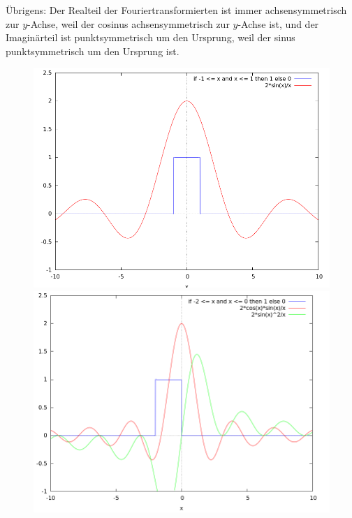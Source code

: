 \begin{remark}
\begin{enumerate}
  	Übrigens: Der Realteil der Fouriertransformierten ist immer achsensymmetrisch zur $ y $-Achse,
  	weil der cosinus achsensymmetrisch zur $ y $-Achse ist, und der Imaginärteil ist 
  	punktsymmetrisch um den Ursprung, weil der sinus punktsymmetrisch um den Ursprung ist.
    \begin{figure}[ht]
      \centering
      \begin{minipage}{0.49\linewidth}
        \centering
        \includegraphics[width=\linewidth]{Bilder/Rechteck1}
      \end{minipage}
      \begin{minipage}{0.49\linewidth}
        \centering
        \includegraphics[width=\linewidth]{Bilder/Rechteck2}
      \end{minipage}

\end{figure}
\end{enumerate}
\end{remark}
